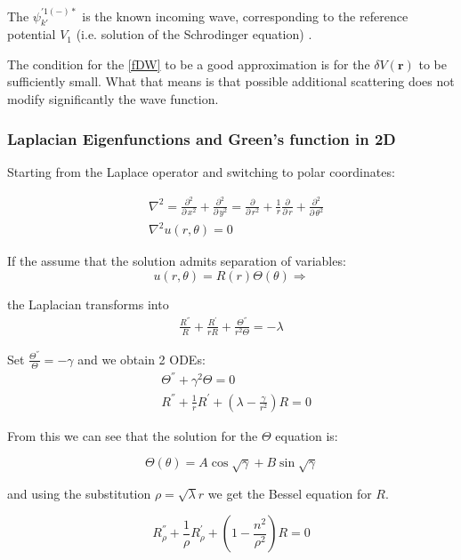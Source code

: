 The $ \psi^{'1(-)*}_{k'} $ is the known incoming wave, corresponding to the reference potential $ V_1 $ (i.e. solution of the Schrodinger equation) .

The condition for the \eqref{fDW} to be a good approximation is for the $ \delta V(\mathbf{r}) $ to be sufficiently small. What that means is that possible additional scattering does not modify significantly the wave function.

\subsubsection{Laplacian Eigenfunctions and Green's function in 2D}

Starting from the Laplace operator and switching to polar coordinates:

\begin{equation}
\begin{split}
& \nabla^2 = \frac{\partial^2}{\partial\,x^2} + \frac{\partial^2}{\partial\,y^2} = \frac{\partial}{\partial\,r^2} + \frac{1}{r}\frac{\partial}{\partial\,r} + \frac{\partial^2}{\partial\,\theta^2} \\[.8em]
& \nabla^2u(r,\theta) = 0
\end{split}
\end{equation}

If the assume that the solution admits separation of variables:
\begin{equation}
u(r,\theta) = R(r)\Theta(\theta) \Longrightarrow
\end{equation}

the Laplacian transforms into
\begin{equation}
\begin{split}
\frac{R^{''}}{R} + \frac{R^{'}}{rR} + \frac{\Theta^{''}}{r^2\Theta} = -\lambda
\end{split}
\end{equation}

Set $ \frac{\Theta^{''}}{\Theta} = -\gamma $ and we obtain 2 ODEs:
\begin{equation}
\begin{split}
& \Theta^{''} + \gamma^2\Theta = 0 \\[.8em]
& R^{''} + \frac{1}{r}R^{'} + \left(\lambda - \frac{\gamma}{r^2}\right) R = 0
\end{split}
\end{equation}

From this we can see that the solution for the $ \Theta $ equation is:

\begin{equation}
\Theta(\theta) = A\cos\sqrt{\gamma} + B\sin\sqrt{\gamma}
\end{equation}

and using the substitution $ \rho = \sqrt{\lambda}r $ we get the Bessel equation for $ R $.

\begin{equation}
R^{''}_{\rho} + \frac{1}{\rho}R^{'}_{\rho} + \left(1 - \frac{n^2}{\rho^2}\right)R = 0
\end{equation}


